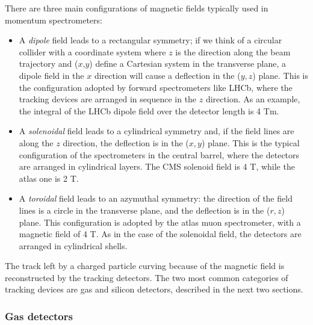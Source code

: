 There are three main configurations of magnetic fields typically used in momentum spectrometers:
\begin{itemize}
\item A \textit{dipole} field leads to a rectangular symmetry; if we think of a circular collider with a coordinate system where $z$ is the direction along the beam trajectory and ($x$,$y$) define a Cartesian system in the transverse plane, a dipole  field in the $x$ direction will cause a deflection in the ($y,z$) plane. This is the configuration adopted by forward spectrometers like LHCb, where the tracking devices are arranged in sequence in the $z$ direction. As an example, the integral of the LHCb dipole field over the detector length is 4 Tm.

\item A \textit{solenoidal} field leads to a cylindrical symmetry and, if the field lines are along the $z$ direction, the deflection is in the ($x,y$) plane. This is the typical configuration of the spectrometers in the central barrel, where the detectors are arranged in cylindrical layers. The CMS solenoid field is 4 T, while the \gls{atlas} one is 2 T. 

\item A \textit{toroidal} field leads to an azymuthal symmetry: the direction of the field lines is a circle in the transverse plane, and the deflection is in the ($r,z$) plane. This configuration is adopted by the \gls{atlas} muon spectrometer, with a magnetic field of 4 T. As in the case of the solenoidal field, the detectors are arranged in cylindrical shells.
\end{itemize}

The track left by a charged particle curving because of the magnetic field is reconstructed by the tracking detectors. The two most common categories of tracking devices are gas and silicon detectors, described in the next two sections.

\subsubsection*{Gas detectors}


